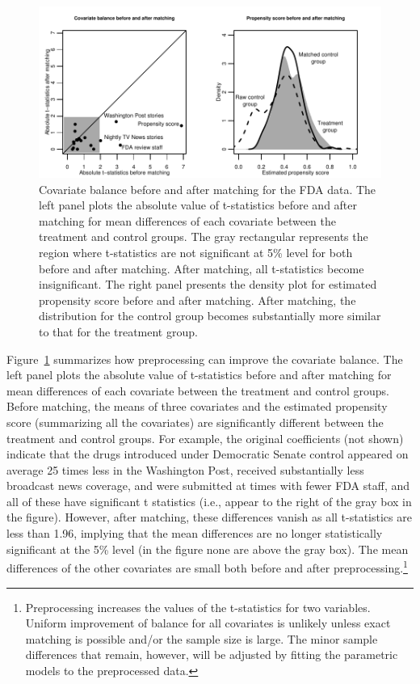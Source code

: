 \documentclass[11pt,titlepage]{article}
\begin{document}
\begin{figure}[t] 
 \begin{center}
   \includegraphics{figs/fdabal.pdf}
  \end{center}
  \vspace{-0.275in}
  \caption{Covariate balance before and after matching for the FDA data.
    The left panel plots the absolute value of t-statistics before and
    after matching for mean differences of each covariate between the
    treatment and control groups. The gray rectangular represents the
    region where t-statistics are not significant at 5\% level for
    both before and after matching. After matching, all t-statistics
    become insignificant. The right panel presents the density plot
    for estimated propensity score before and after matching. After
    matching, the distribution for the control group becomes
    substantially more similar to that for the treatment group.}
  \label{fg:fdabal}
\end{figure}

Figure~\ref{fg:fdabal} summarizes how preprocessing can improve the
covariate balance. The left panel plots the absolute value of
t-statistics before and after matching for mean differences of each
covariate between the treatment and control groups.  Before matching,
the means of three covariates and the estimated propensity score
(summarizing all the covariates) are significantly different between
the treatment and control groups.  For example, the original
coefficients (not shown) indicate that the drugs introduced under
Democratic Senate control appeared on average 25 times less in the
Washington Post, received substantially less broadcast news coverage,
and were submitted at times with fewer FDA staff, and all of these
have significant t statistics (i.e., appear to the right of the gray
box in the figure).  However, after matching, these differences vanish
as all t-statistics are less than 1.96, implying that the mean
differences are no longer statistically significant at the 5\% level
(in the figure none are above the gray box).  The mean differences of
the other covariates are small both before and after
preprocessing.\footnote{Preprocessing increases the values of the
  t-statistics for two variables. Uniform improvement of balance for
  all covariates is unlikely unless exact matching is possible and/or
  the sample size is large. The minor sample differences that remain,
  however, will be adjusted by fitting the parametric models to the
  preprocessed data.}
\end{document}
